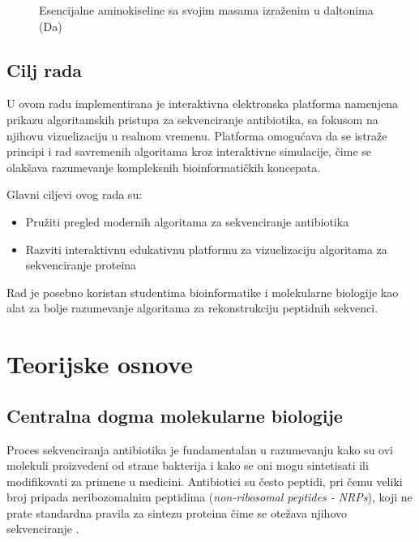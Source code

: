 \documentclass[12pt,oneside]{memoir}
\begin{document}
\begin{figure}[h]
  \centering
  
  \caption{Esencijalne aminokiseline sa svojim masama izraženim u daltonima (Da)}
  \label{fig:aminokiseline}
\end{figure}

\section{Cilj rada}
U ovom radu implementirana je interaktivna elektronska platforma namenjena prikazu algoritamskih pristupa za sekvenciranje antibiotika, sa fokusom na njihovu vizuelizaciju u realnom vremenu. Platforma omogućava da se istraže principi i rad savremenih algoritama kroz interaktivne simulacije, čime se olakšava razumevanje kompleksnih bioinformatičkih koncepata.

Glavni ciljevi ovog rada su:
\begin{itemize}
    \item Pružiti pregled modernih algoritama za sekvenciranje antibiotika
    \item Razviti interaktivnu edukativnu platformu za vizuelizaciju algoritama za sekvenciranje proteina
\end{itemize}

Rad je posebno koristan studentima bioinformatike i molekularne biologije kao alat za bolje razumevanje algoritama za rekonstrukciju peptidnih sekvenci.

\chapter{Teorijske osnove}

\section{Centralna dogma molekularne biologije}
Proces sekvenciranja antibiotika je fundamentalan u razumevanju kako su ovi molekuli proizvedeni od strane bakterija i kako se oni mogu sintetisati ili modifikovati za primene u medicini. Antibiotici su često peptidi, pri čemu veliki broj pripada neribozomalnim peptidima (\emph{non-ribosomal peptides - NRPs}), koji ne prate standardna pravila za sintezu proteina čime se otežava njihovo sekvenciranje \cite{online_lecture, online_book}.
\end{document}
